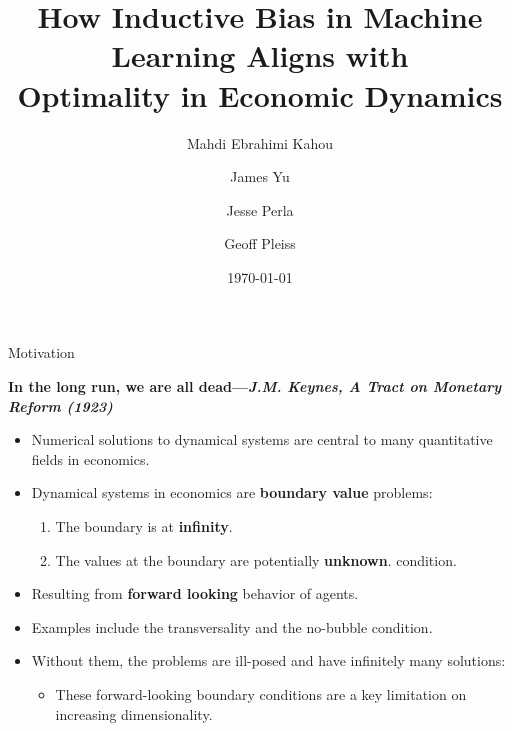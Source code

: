\documentclass[aspectratio=169,10pt]{beamer}
\newcommand{\emphcolor}[1]{\textbf{\textcolor{emphcolorval}{#1}}}
\begin{document}
\title{{\vspace{0.4in}\hspace{0.2in}\textcolor{PennBlue}{How Inductive Bias in Machine Learning Aligns with \\ \hspace*{5 mm}Optimality in Economic Dynamics}}}
\author{\hspace{0.2in}Mahdi Ebrahimi Kahou\and
	James Yu  \and Jesse Perla \and Geoff Pleiss}

\date{\hspace{0.2in}\today }
\maketitle

\begin{frame}{Motivation}
	\begin{center}
		\emphcolor{In the long run, we are all dead---{\it J.M. Keynes, A Tract on Monetary Reform (1923)}}
	\end{center}
	\begin{itemize}
		\item Numerical solutions to dynamical systems are central to many quantitative fields in economics.
		\vspace{0.1in}
		\item Dynamical systems in economics are \emphcolor{boundary value} problems:
		\vspace{0.1in}
		\begin{enumerate}
				\item The boundary is at \emphcolor{infinity}.
				\vspace{0.05in}
				\item The values at the boundary are potentially \emphcolor{unknown}.
				\vspace{0.05in} 
				 condition. 
		\end{enumerate}
		\item Resulting from \emphcolor{forward looking} behavior of agents.
		\vspace{0.1in}
		\item Examples include the transversality and the no-bubble condition.
		\vspace{0.1in}
		\item Without them, the problems are ill-posed  and have infinitely many solutions: 
		\vspace{0.1in}
		\begin{itemize}
			\item These forward-looking boundary conditions are a key limitation on increasing dimensionality.
		\end{itemize}
	\end{itemize}
\end{frame}
\end{document}
